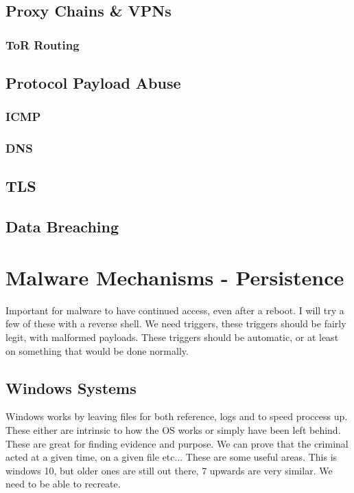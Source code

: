 \section{Proxy Chains \& VPNs}
\subsection{ToR Routing}
\section{Protocol Payload Abuse}
\subsection{ICMP}
\subsection{DNS}
\section{TLS}
\section{Data Breaching}




\chapter{Malware Mechanisms - Persistence}
Important for malware to have continued access, even after a reboot. I will try a few of these with a reverse shell. 
We need triggers, these triggers should be fairly legit, with malformed payloads. These triggers should be automatic, or at least on something that would be done normally.

\section{Windows Systems}
Windows works by leaving files for both reference, logs and to speed proccess up. These either are intrinsic to how the OS works or simply have been left behind. 
These are great for finding evidence and purpose. We can prove that the criminal acted at a given time, on a given file etc... These are some useful areas. This is windows 10, but older ones are still out there, 7 upwards are very similar. We need to be able to recreate.

